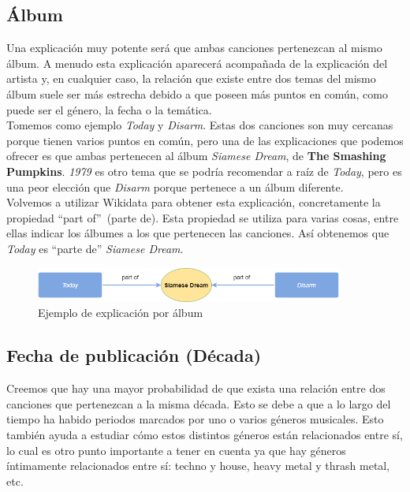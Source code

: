 \subsection*{Álbum}

Una explicación muy potente será que ambas canciones pertenezcan al mismo álbum. A menudo esta explicación aparecerá acompañada de la explicación del artista y, en cualquier caso, la relación que existe entre dos temas del mismo álbum suele ser más estrecha debido a que poseen más puntos en común, como puede ser el género, la fecha o la temática.\\

Tomemos como ejemplo \textit{Today} y \textit{Disarm}. Estas dos canciones son muy cercanas porque tienen varios puntos en común, pero una de las explicaciones que podemos ofrecer es que ambas pertenecen al álbum \textit{Siamese Dream}, de \textbf{The Smashing Pumpkins}. \textit{1979} es otro tema que se podría recomendar a raíz de \textit{Today}, pero es una peor elección que \textit{Disarm} porque pertenece a un álbum diferente.\\

Volvemos a utilizar Wikidata para obtener esta explicación, concretamente la propiedad ``part of''~(parte de). Esta propiedad se utiliza para varias cosas, entre ellas indicar los álbumes a los que pertenecen las canciones. Así obtenemos que \textit{Today} es ``parte de'' \textit{Siamese Dream}.\\

\begin{figure}[h!]
	\centering
	\includegraphics[width = 0.9\textwidth]{Imagenes/Bitmap/Álbum ejemplo.png}
	\caption{Ejemplo de explicación por álbum}
	\label{fig:sampleImage}
\end{figure}

\subsection*{Fecha de publicación (Década)}

Creemos que hay una mayor probabilidad de que exista una relación entre dos canciones que pertenezcan a la misma década. Esto se debe a que a lo largo del tiempo ha habido periodos marcados por uno o varios géneros musicales. Esto también ayuda a estudiar cómo estos distintos géneros están relacionados entre sí, lo cual es otro punto importante a tener en cuenta ya que hay géneros íntimamente relacionados entre sí: techno y house, heavy metal y thrash metal, etc.\\


